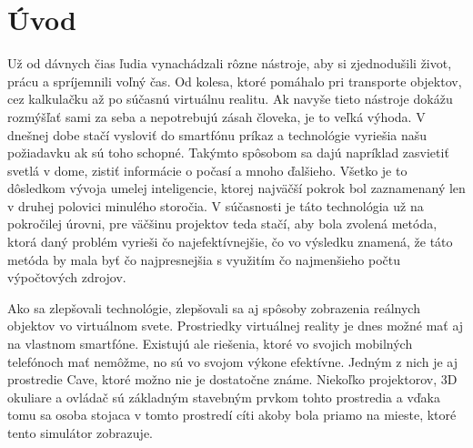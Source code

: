 \section*{Úvod}

Už od dávnych čias ľudia vynachádzali rôzne nástroje, aby si zjednodušili život, prácu a spríjemnili voľný čas.
Od kolesa, ktoré pomáhalo pri transporte objektov, cez kalkulačku až po súčasnú virtuálnu realitu.
Ak navyše tieto nástroje dokážu rozmýšľať sami za seba a nepotrebujú zásah človeka, je to veľká výhoda.
V dnešnej dobe stačí vysloviť do smartfónu príkaz a technológie vyriešia našu požiadavku ak sú toho schopné.
Takýmto spôsobom sa dajú napríklad zasvietiť svetlá v dome, zistiť informácie o počasí a mnoho ďalšieho.
Všetko je to dôsledkom vývoja umelej inteligencie, ktorej najväčší pokrok bol zaznamenaný len v druhej polovici
minulého storočia.
V súčasnosti je táto technológia už na pokročilej úrovni, pre väčšinu projektov teda stačí, aby bola zvolená metóda,
ktorá daný problém vyrieši čo najefektívnejšie, čo vo výsledku znamená, že táto metóda by mala byť čo najpresnejšia
s využitím čo najmenšieho počtu výpočtových zdrojov.

Ako sa zlepšovali technológie, zlepšovali sa aj spôsoby zobrazenia reálnych objektov vo virtuálnom svete.
Prostriedky virtuálnej reality je dnes možné mať aj na vlastnom smartfóne.
Existujú ale riešenia, ktoré vo svojich mobilných telefónoch mať nemôžme, no sú vo svojom výkone efektívne.
Jedným z nich je aj prostredie Cave, ktoré možno nie je dostatočne známe.
Niekoľko projektorov, 3D okuliare a ovládač sú základným stavebným prvkom tohto prostredia a vďaka tomu sa osoba
stojaca v tomto prostredí cíti akoby bola priamo na mieste, ktoré tento simulátor zobrazuje.
